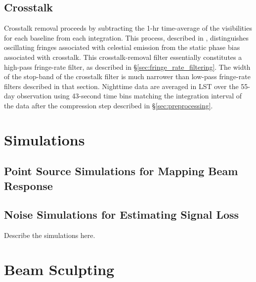 \documentclass[twocolumn,numberedappendix]{emulateapj}
\begin{document}
\subsection{Crosstalk}

Crosstalk removal proceeds by subtracting the
1-hr time-average of the visibilities for each baseline from each integration.  This process,
described in \citet{parsons_et_al2010}, distinguishes oscillating fringes associated with 
celestial emission from the static phase bias associated with crosstalk. This crosstalk-removal
filter essentially constitutes a high-pass fringe-rate filter, as described in \S\ref{sec:fringe_rate_filtering}.
The width of the stop-band of the crosstalk filter is much narrower than low-pass fringe-rate filters described in
that section.
Nighttime data are averaged in LST over the 55-day observation using 43-second
time bins matching the integration interval of the data after the compression step described
in \S\ref{sec:preprocessing}.


\section{Simulations}
\label{sec:sim}

\subsection{Point Source Simulations for Mapping Beam Response}
\label{sec:sim_pnt}

\subsection{Noise Simulations for Estimating Signal Loss}
\label{sec:sim_nos}

Describe the simulations here.

\section{Beam Sculpting}
\label{sec:bmsculpt}
\end{document}
